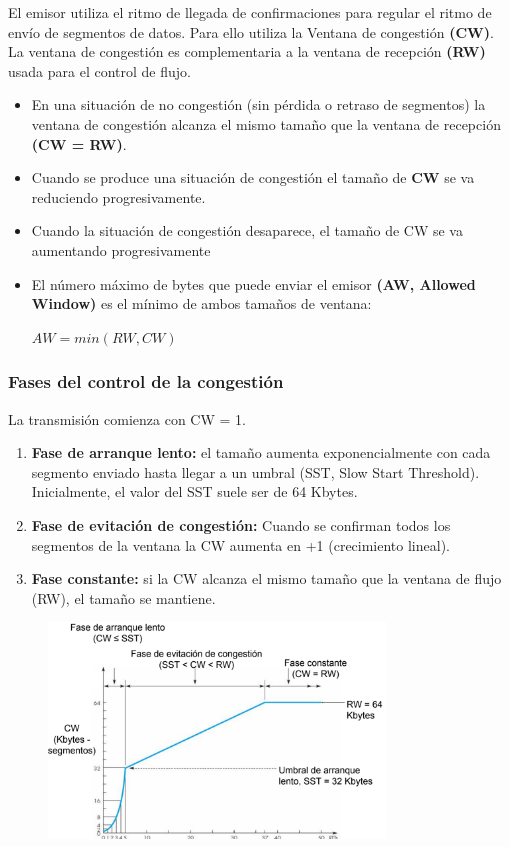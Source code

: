 El emisor utiliza el ritmo de llegada de confirmaciones para regular el ritmo de
envío de segmentos de datos. Para ello utiliza la Ventana de congestión \textbf{(CW)}.\\

La ventana de congestión es complementaria a la ventana de recepción \textbf{(RW)} usada para el control de flujo.
\begin{itemize}
    \item En una situación de no congestión (sin pérdida o retraso de segmentos) la ventana de congestión alcanza el mismo tamaño que la ventana de recepción \textbf{(CW = RW)}.
    \item Cuando se produce una situación de congestión el tamaño de \textbf{CW} se va reduciendo progresivamente.
    \item Cuando la situación de congestión desaparece, el tamaño de CW se va aumentando progresivamente
    \item El número máximo de bytes que puede enviar el emisor \textbf{(AW, Allowed Window)} es el mínimo de ambos tamaños de ventana:\\
    \begin{center}
        $AW = min ( RW, CW )$
    \end{center}
\end{itemize}

\subsubsection{Fases del control de la congestión}
La transmisión comienza con CW = 1.
\begin{enumerate}
    \item \textbf{Fase de arranque lento:} el tamaño aumenta exponencialmente con cada segmento enviado hasta llegar a un umbral (SST, Slow Start Threshold). Inicialmente, el valor del SST suele ser de 64 Kbytes.
    \item \textbf{Fase de evitación de congestión:} Cuando se confirman todos los segmentos de la ventana la CW aumenta en +1 (crecimiento lineal).
    \item \textbf{Fase constante:} si la CW alcanza el mismo tamaño que la ventana de flujo (RW), el tamaño se mantiene.
\end{enumerate}
    \begin{figure}[H] \centering
    \includegraphics[width=0.8\textwidth]{img/TCP_FasesCong.png}\end{figure}
    
